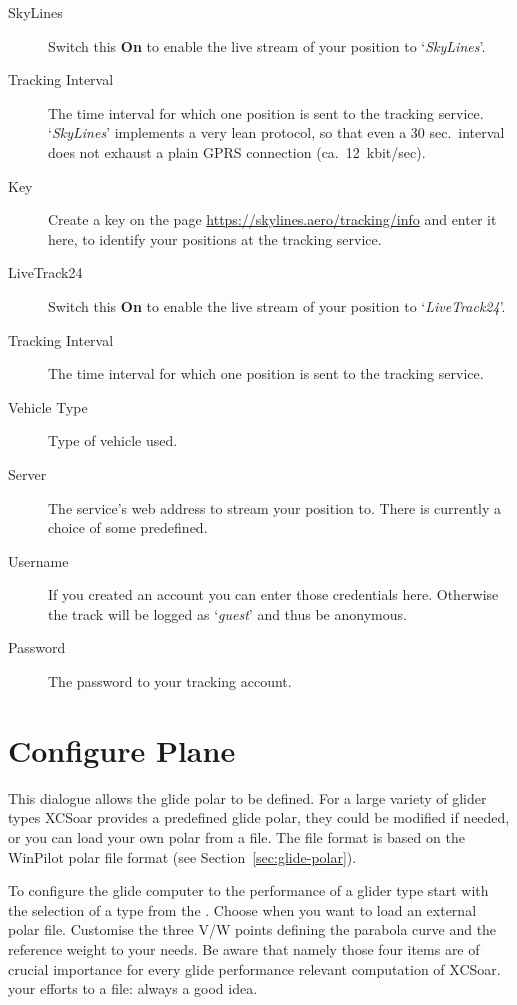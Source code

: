 \begin{description}
\item[SkyLines]  Switch this {\bf On} to enable the live stream of 
  your position to `{\em SkyLines}'.
\item[Tracking Interval]  The time interval for which one position is sent to
  the tracking service. `{\em SkyLines}' implements a very lean protocol, so that even
  a 30 sec.\ interval does not exhaust a plain GPRS connection (ca.\ 12~kbit/sec).
\item[Key]  Create a key on the page \url{https://skylines.aero/tracking/info} 
  and enter it here, to identify your positions at the tracking service.
\\
\item[LiveTrack24]  Switch this {\bf On} to enable the live stream of 
  your position to `{\em LiveTrack24}'.
\item[Tracking Interval]  The time interval for which one position is sent to
  the tracking service.
\item[Vehicle Type]  Type of vehicle used.
\item[Server]  The service's web address to stream your position to. There is currently 
  a choice of some predefined.
\item[Username]  If you created an account you can enter those credentials here. 
  Otherwise the track will be logged as `{\it guest}' and thus be anonymous.  
\item[Password]  The password to your tracking account.
\end{description}


\section{Configure Plane}

This dialogue allows the glide polar to be defined. For a large variety of glider
types XCSoar provides a predefined glide polar, they could be modified if 
needed, or you can load your own polar from a file. 
The file format is based on the WinPilot polar file format (see Section~\ref{sec:glide-polar}).

\label{conf:polar} To configure the glide computer to the performance of a glider 
type start with the selection of a type from the . 
Choose  when you want to load an external polar file.
Customise the three V/W points defining the parabola curve and the reference
weight to your needs. 
\tip Be aware that namely those four items are of crucial importance 
for every glide performance relevant computation of XCSoar.   
 your efforts to a file: always a good idea.

